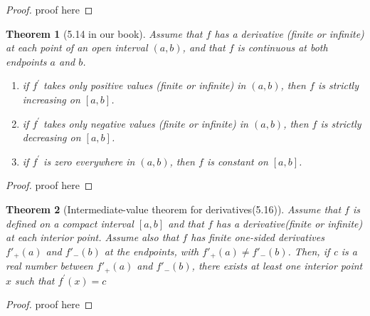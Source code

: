 \documentclass[aps,pra,notitlepage,amsmath,amssymb,letterpaper,12pt]{revtex4-1}
\newtheorem{theorem}{Theorem}
\begin{document}
\begin{proof}
proof here
\end{proof}

\begin{theorem}[5.14 in our book]
Assume that $f$ has a derivative (finite or infinite) at each point of an open interval $(a,b)$, and that $f$ is continuous at both endpoints $a$ and $b$.
\begin{enumerate}[\upshape (a)]
  \item if $f^\prime$ takes only positive values (finite or infinite) in $(a,b)$, then $f$ is strictly increasing on $[a,b]$.
  \item if $f^\prime$ takes only negative values (finite or infinite) in $(a,b)$, then $f$ is strictly decreasing on $[a,b]$.
  \item if $f^\prime$ is zero everywhere in $(a,b)$, then $f$ is constant on $[a,b]$.
\end{enumerate}
\end{theorem}

\begin{proof}
proof here
\end{proof}

\begin{theorem}[Intermediate-value theorem for derivatives(5.16)]
Assume that $f$ is defined on a compact interval $[a,b]$ and that $f$ has a derivative(finite or infinite) at each interior point. Assume also that $f$ has finite one-sided derivatives $f'_{+}(a)$ and $f'_{-}(b)$ at the endpoints, with $f'_{+}(a)\neq f'_{-}(b)$. Then, if c is a real number between $f'_{+}(a)$ and $f'_{-}(b)$, there exists at least one interior point $x$ such that $f^\prime(x)=c$
\end{theorem}

\begin{proof}
proof here
\end{proof}






\end{document}
